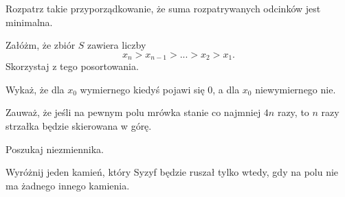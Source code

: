 
\begin{hints_list}
	\item Rozpatrz takie przyporządkowanie, że suma rozpatrywanych odcinków jest minimalna.
	\item Załóżm, że zbiór $S$ zawiera liczby
	\[
		x_n > x_{n - 1} > ... > x_2 > x_1.
	\]
	Skorzystaj z tego posortowania.
	\item Wykaż, że dla $x_0$ wymiernego kiedyś pojawi się $0$, a dla $x_0$ niewymiernego nie.
	\item Zauważ, że jeśli na pewnym polu mrówka stanie co najmniej $4n$ razy, to $n$ razy strzałka będzie skierowana w górę.
	\item Poszukaj niezmiennika.
	\item Wyróżnij jeden kamień, który Syzyf będzie ruszał tylko wtedy, gdy na polu nie ma żadnego innego kamienia.
\end{hints_list}